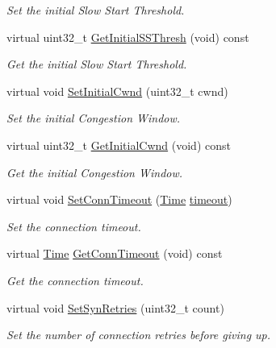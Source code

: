 \begin{DoxyCompactItemize}
\begin{DoxyCompactList}\small\item\em Set the initial Slow Start Threshold. \end{DoxyCompactList}\item 
virtual uint32\+\_\+t \hyperlink{classns3_1_1TcpSocketBase_aa2237283f17696ffbf78040668c44138}{Get\+Initial\+S\+S\+Thresh} (void) const 
\begin{DoxyCompactList}\small\item\em Get the initial Slow Start Threshold. \end{DoxyCompactList}\item 
virtual void \hyperlink{classns3_1_1TcpSocketBase_aa3735c7914a19141ea1751b862e42eab}{Set\+Initial\+Cwnd} (uint32\+\_\+t cwnd)
\begin{DoxyCompactList}\small\item\em Set the initial Congestion Window. \end{DoxyCompactList}\item 
virtual uint32\+\_\+t \hyperlink{classns3_1_1TcpSocketBase_a2ac4eb2a33a8db482f4265f3bf119b76}{Get\+Initial\+Cwnd} (void) const 
\begin{DoxyCompactList}\small\item\em Get the initial Congestion Window. \end{DoxyCompactList}\item 
virtual void \hyperlink{classns3_1_1TcpSocketBase_a3d0bf93406d7def639741d5ea132d66e}{Set\+Conn\+Timeout} (\hyperlink{classns3_1_1Time}{Time} \hyperlink{openflow-switch_8cc_a386d174ae121d1cfa279074b7e209714}{timeout})
\begin{DoxyCompactList}\small\item\em Set the connection timeout. \end{DoxyCompactList}\item 
virtual \hyperlink{classns3_1_1Time}{Time} \hyperlink{classns3_1_1TcpSocketBase_a523cfca900c9e27b6687bbb983e2585e}{Get\+Conn\+Timeout} (void) const 
\begin{DoxyCompactList}\small\item\em Get the connection timeout. \end{DoxyCompactList}\item 
virtual void \hyperlink{classns3_1_1TcpSocketBase_a79b5050d650fcb425531ae9a8561250f}{Set\+Syn\+Retries} (uint32\+\_\+t count)
\begin{DoxyCompactList}\small\item\em Set the number of connection retries before giving up. \end{DoxyCompactList}\item 

\end{DoxyCompactItemize}
